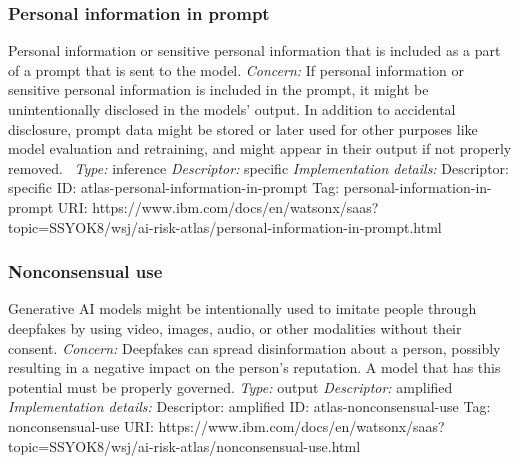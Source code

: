 \documentclass{article}
\begin{document}
\subsubsection*{Personal information in prompt}
Personal information or sensitive personal information that is included as a part of a prompt that is sent to the model.\newline
\textit{Concern: }If personal information or sensitive personal information is included in the prompt, it might be unintentionally disclosed in the models' output. In addition to accidental disclosure, prompt data might be stored or later used for other purposes like model evaluation and retraining, and might appear in their output if not properly removed. \newline\newline
\textit{Type: }inference\newline
\textit{Descriptor: }specific \newline\newline
\textit{Implementation details:} \newline
Descriptor: specific \newline
ID: atlas-personal-information-in-prompt \newline
Tag: personal-information-in-prompt \newline
URI:  https://www.ibm.com/docs/en/watsonx/saas?topic=SSYOK8/wsj/ai-risk-atlas/personal-information-in-prompt.html\newline
\subsubsection*{Nonconsensual use}
Generative AI models might be intentionally used to imitate people through deepfakes by using video, images, audio, or other modalities without their consent.\newline
\textit{Concern: }Deepfakes can spread disinformation about a person, possibly resulting in a negative impact on the person's reputation. A model that has this potential must be properly governed.\newline\newline
\textit{Type: }output\newline
\textit{Descriptor: }amplified \newline\newline
\textit{Implementation details:} \newline
Descriptor: amplified \newline
ID: atlas-nonconsensual-use \newline
Tag: nonconsensual-use \newline
URI:  https://www.ibm.com/docs/en/watsonx/saas?topic=SSYOK8/wsj/ai-risk-atlas/nonconsensual-use.html\newline
\end{document}
